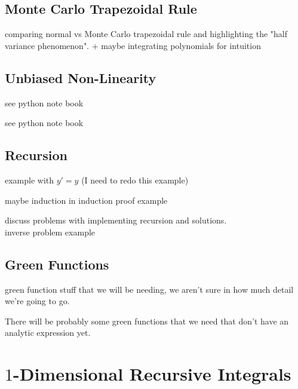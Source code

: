 \documentclass[a4paper,12pt,fleqn]{article}
\begin{document}
\subsection{Monte Carlo Trapezoidal Rule}
comparing normal vs Monte Carlo trapezoidal rule and highlighting the "half variance phenomenon".
+ maybe integrating polynomials for intuition

\subsection{Unbiased Non-Linearity}
\begin{example}[$y'=y^{2}$]
    see python note book
\end{example}

\begin{example}[$e^{E[X]}$]
    see python note book
\end{example}

\subsection{Recursion}

\begin{example}
    example with $y'=y$ (I need to redo this example)
\end{example}

\begin{example}
    maybe induction in induction proof example
\end{example}

\begin{example}
    discuss problems with implementing recursion and solutions.  \\
    inverse problem example
\end{example}

\subsection{Green Functions}
green function stuff that we will be needing, we aren't sure in how much detail we're going to go.

\begin{example}
    There will be probably some green functions that we need
    that don't have an analytic expression yet.
\end{example}

\section{$1$-Dimensional Recursive Integrals}
\end{document}
